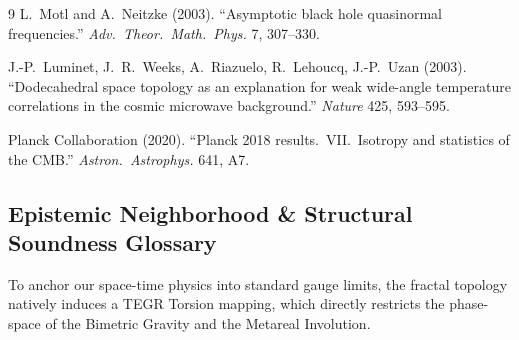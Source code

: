 \begin{thebibliography}{9}
L.~Motl and A.~Neitzke (2003).
``Asymptotic black hole quasinormal frequencies.''
\textit{Adv.\ Theor.\ Math.\ Phys.} 7, 307--330.

J.-P.~Luminet, J.~R.~Weeks, A.~Riazuelo, R.~Lehoucq, J.-P.~Uzan (2003).
``Dodecahedral space topology as an explanation for weak wide-angle temperature correlations in the cosmic microwave background.''
\textit{Nature} 425, 593--595.

Planck Collaboration (2020).
``Planck 2018 results.\ VII.\ Isotropy and statistics of the CMB.''
\textit{Astron.\ Astrophys.} 641, A7.

\end{thebibliography}

\subsection*{Epistemic Neighborhood \& Structural Soundness Glossary}
To anchor our space-time physics into standard gauge limits, the fractal topology natively induces a TEGR Torsion mapping, which directly restricts the phase-space of the Bimetric Gravity and the Metareal Involution.


